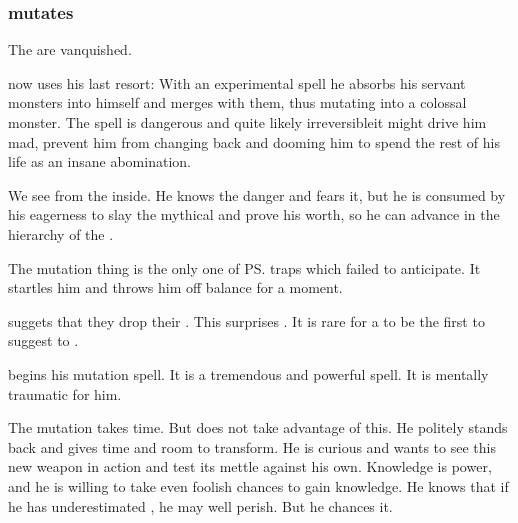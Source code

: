 \subsubsection{\Teshrial mutates}
The \noggyaleth{} are vanquished. 

\Teshrial{} now uses his last resort: With an experimental spell he absorbs his servant monsters into himself and merges with them, thus mutating into a colossal monster. The spell is dangerous and quite likely irreversible\dash it might drive him mad, prevent him from changing back and dooming him to spend the rest of his life as an insane abomination. 

We see \Teshrial{} from the inside. He knows the danger and fears it, but he is consumed by his eagerness to slay the mythical \Ishnaruchaefir{} and prove his worth, so he can advance in the hierarchy of the \ketherain. 

The mutation thing is the only one of \ps{\Teshrial} traps which \Ishnaruchaefir{} failed to anticipate. 
It startles him and throws him off balance for a moment. 

\Teshrial{} suggets that they drop their . 
This surprises \Ishnaruchaefir{}. 
It is rare for a \resphan{} to be the first to suggest to . 

\Teshrial begins his mutation spell. 
It is a tremendous and powerful spell. 
It is mentally traumatic for him. 


The mutation takes time. 
But \Ishnaruchaefir{} does not take advantage of this. 
He politely stands back and gives \Teshrial{} time and room to transform. 
He is curious and wants to see this new weapon in action and test its mettle against his own. 
Knowledge is power, and he is willing to take even foolish chances to gain knowledge. 
He knows that if he has underestimated \Teshrial, he may well perish. 
But he chances it. 

